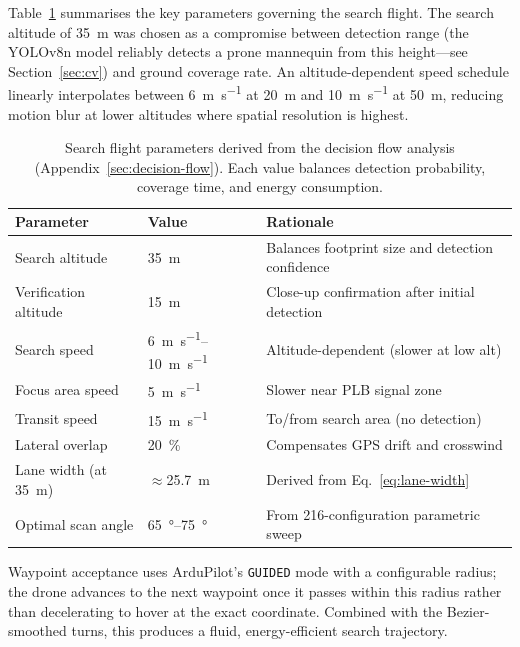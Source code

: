 Table~\ref{tab:flight-params} summarises the key parameters governing the search flight. The search altitude of \SI{35}{\metre} was chosen as a compromise between detection range (the YOLOv8n model reliably detects a prone mannequin from this height---see Section~\ref{sec:cv}) and ground coverage rate. An altitude-dependent speed schedule linearly interpolates between \SI{6}{\metre\per\second} at \SI{20}{\metre} and \SI{10}{\metre\per\second} at \SI{50}{\metre}, reducing motion blur at lower altitudes where spatial resolution is highest.

\begin{table}[ht]
  \centering\compactTable
  \caption{Search flight parameters derived from the decision flow analysis (Appendix~\ref{sec:decision-flow}).  Each value balances detection probability, coverage time, and energy consumption.}\label{tab:flight-params}
  \begin{tabularx}{\linewidth}{@{}l l X@{}}
    \toprule
    \textbf{Parameter} & \textbf{Value} & \textbf{Rationale} \\
    \midrule
    Search altitude        & \SI{35}{\metre}               & Balances footprint size and detection confidence \\
    Verification altitude  & \SI{15}{\metre}               & Close-up confirmation after initial detection \\
    Search speed           & \SIrange{6}{10}{\metre\per\second} & Altitude-dependent (slower at low alt) \\
    Focus area speed       & \SI{5}{\metre\per\second}     & Slower near PLB signal zone \\
    Transit speed          & \SI{15}{\metre\per\second}    & To/from search area (no detection) \\
    Lateral overlap        & \SI{20}{\percent}             & Compensates GPS drift and crosswind \\
    Lane width (at \SI{35}{\metre}) & $\approx$\SI{25.7}{\metre} & Derived from Eq.~\eqref{eq:lane-width} \\
    Optimal scan angle     & \SIrange{65}{75}{\degree}     & From 216-configuration parametric sweep \\
    \bottomrule
  \end{tabularx}
\end{table}

Waypoint acceptance uses ArduPilot's \texttt{GUIDED} mode with a configurable radius; the drone advances to the next waypoint once it passes within this radius rather than decelerating to hover at the exact coordinate. Combined with the Bezier-smoothed turns, this produces a fluid, energy-efficient search trajectory.

